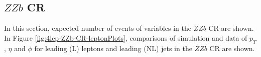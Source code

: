 \subsection{$ZZb$ CR}
\label{sec:controlplotstetralepton-ZZb-CR}


In this section, expected number of events of variables in the $ZZb$ CR are shown. In Figure \ref{fig:4lep-ZZb-CR-leptonPlots}, comparisons of simulation and data of $p_{T}$, $\eta$ and $\phi$ for leading (L) leptons and leading (NL) jets in the $ZZb$ CR are shown.

\begin{figure}[htbp]
\centering
  \begin{tabular}{ccc}



\end{tabular}
\end{figure}
